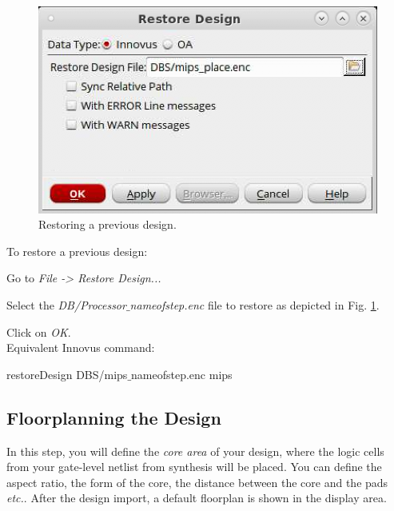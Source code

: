 \begin{enumerate}
	\parbox[t]{\dimexpr\textwidth-\leftmargin}{%

		\begin{figure}
					\vspace{0mm}
			\centering
			\vspace{-\baselineskip}
			\includegraphics[scale=0.35]{figures/lab5_backend/restore_design}
		\caption{Restoring a previous design.}
			\label{fig_restore_design}
		\end{figure}
	To restore a previous design:
			\vspace{-4mm}
		\item Go to \textit{File -> Restore Design...}
	\item Select the \textit{DB/Processor$\_$nameofstep.enc} file to restore as depicted in Fig. \ref{fig_restore_design}.
		\item Click on \textit{OK}.  \\
		Equivalent Innovus command:
		\begin{codeline}
			restoreDesign DBS/mips$\_$nameofstep.enc mips
		\end{codeline}
	} 
\end{enumerate}



\newpage
\subsection{Floorplanning the Design}
In this step, you will define the \textit{core area} of your design, where the logic cells from your gate-level netlist from synthesis will be placed. You can define the aspect ratio, the form of the core, the distance between the core and the pads \textit{etc.}. After the design import, a default floorplan is shown in the display area. 
